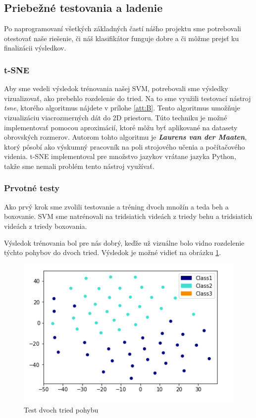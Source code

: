 \subsection{Priebežné testovania a ladenie}
Po naprogramovaní všetkých základných častí nášho projektu sme potrebovali otestovať naše riešenie, či náš klasifikátor funguje dobre a či môžme prejsť ku finalizácii výsledkov. 


\subsubsection{t-SNE}
Aby sme vedeli výsledok trénovania našej SVM, potrebovali sme výsledky vizualizovať, ako prebehlo rozdelenie do tried. Na to sme využili testovací nástroj \textit{\acrfull{tsne}}, ktorého algoritmus nájdete v prílohe \ref{att:B}. Tento algoritmus umožňuje vizualizáciu viacrozmerných dát do 2D priestoru. Túto techniku je možné implementovať pomocou aproximácií, ktoré môžu byť aplikované na datasety obrovských rozmerov. Autorom tohto algoritmu je \textbf{\textit{Laurens van der Maaten}}, ktorý pôsobí ako výskumný pracovník na poli strojového učenia a počítačového videnia. t-SNE implementoval pre množstvo jazykov vrátane jazyka Python, takže sme nemali problém tento nástroj využívať. \cite{c18}

\subsubsection{Prvotné testy}
Ako prvý krok sme zvolili testovanie a tréning dvoch množín a teda beh a boxovanie. SVM sme natrénovali na tridsiatich videách z triedy behu a tridsiatich videách z triedy boxovania. 

Výsledok trénovania bol pre nás dobrý, keďže už vizuálne bolo vidno rozdelenie týchto pohybov do dvoch tried. Výsledok je možné vidieť na obrázku \ref{Test2Class}. 

\begin{figure}[H]
  \centering
  \includegraphics[width=16cm]{img/test2classes.png}
  \caption{Test dvoch tried pohybu}
  \label{Test2Class}
\end{figure} 


